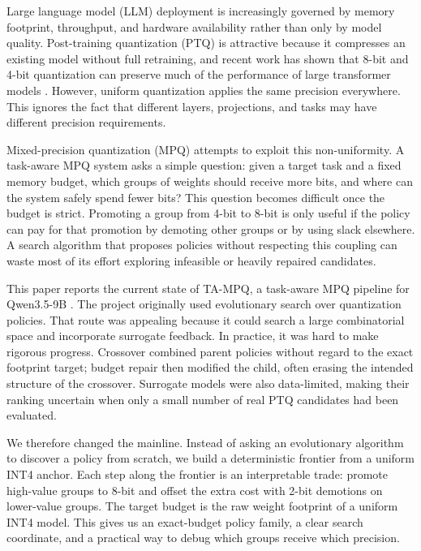 \documentclass{article}
\newcommand{\method}{TA-MPQ}
\begin{document}
Large language model (LLM) deployment is increasingly governed by memory footprint, throughput, and hardware availability rather than only by model quality. Post-training quantization (PTQ) is attractive because it compresses an existing model without full retraining, and recent work has shown that 8-bit and 4-bit quantization can preserve much of the performance of large transformer models \cite{dettmers2022llm,frantar2023gptq,xiao2023smoothquant,lin2024awq}. However, uniform quantization applies the same precision everywhere. This ignores the fact that different layers, projections, and tasks may have different precision requirements.

Mixed-precision quantization (MPQ) attempts to exploit this non-uniformity. A task-aware MPQ system asks a simple question: given a target task and a fixed memory budget, which groups of weights should receive more bits, and where can the system safely spend fewer bits? This question becomes difficult once the budget is strict. Promoting a group from 4-bit to 8-bit is only useful if the policy can pay for that promotion by demoting other groups or by using slack elsewhere. A search algorithm that proposes policies without respecting this coupling can waste most of its effort exploring infeasible or heavily repaired candidates.

This paper reports the current state of \method{}, a task-aware MPQ pipeline for Qwen3.5-9B \cite{qwen2025model}. The project originally used evolutionary search over quantization policies. That route was appealing because it could search a large combinatorial space and incorporate surrogate feedback. In practice, it was hard to make rigorous progress. Crossover combined parent policies without regard to the exact footprint target; budget repair then modified the child, often erasing the intended structure of the crossover. Surrogate models were also data-limited, making their ranking uncertain when only a small number of real PTQ candidates had been evaluated.

We therefore changed the mainline. Instead of asking an evolutionary algorithm to discover a policy from scratch, we build a deterministic frontier from a uniform INT4 anchor. Each step along the frontier is an interpretable trade: promote high-value groups to 8-bit and offset the extra cost with 2-bit demotions on lower-value groups. The target budget is the raw weight footprint of a uniform INT4 model. This gives us an exact-budget policy family, a clear search coordinate, and a practical way to debug which groups receive which precision.
\end{document}
